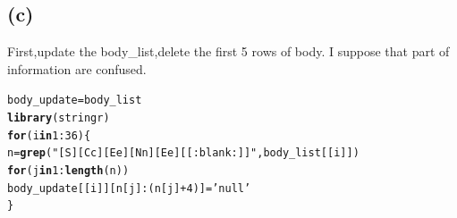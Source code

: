 \documentclass{article}\usepackage[]{graphicx}\usepackage[]{color}
\makeatletter
\newcommand{\hlnum}[1]{\textcolor[rgb]{0.686,0.059,0.569}{#1}}%
\newcommand{\hlstr}[1]{\textcolor[rgb]{0.192,0.494,0.8}{#1}}%
\newcommand{\hlopt}[1]{\textcolor[rgb]{0,0,0}{#1}}%
\newcommand{\hlstd}[1]{\textcolor[rgb]{0.345,0.345,0.345}{#1}}%
\newcommand{\hlkwa}[1]{\textcolor[rgb]{0.161,0.373,0.58}{\textbf{#1}}}%
\newcommand{\hlkwb}[1]{\textcolor[rgb]{0.69,0.353,0.396}{#1}}%
\newcommand{\hlkwd}[1]{\textcolor[rgb]{0.737,0.353,0.396}{\textbf{#1}}}%
\newenvironment{kframe}{%
 \def\at@end@of@kframe{}%
 \ifinner\ifhmode%
  \def\at@end@of@kframe{\end{minipage}}%
  \begin{minipage}{\columnwidth}%
 \fi\fi%
 \def\FrameCommand##1{\hskip\@totalleftmargin \hskip-\fboxsep
 \colorbox{shadecolor}{##1}\hskip-\fboxsep
     \hskip-\linewidth \hskip-\@totalleftmargin \hskip\columnwidth}%
 \MakeFramed {\advance\hsize-\width
   \@totalleftmargin\z@ \linewidth\hsize
   \@setminipage}}%
 {\par\unskip\endMakeFramed%
 \at@end@of@kframe}
\newenvironment{knitrout}{}{} %
\makeatother
\begin{document}
\subsection{(c)}

First,update the body\_list,delete the first 5 rows of body. I suppose that part of information are confused.
\begin{knitrout}
\color{fgcolor}\begin{kframe}
\begin{alltt}
\hlstd{body_update}\hlkwb{=}\hlstd{body_list}
\hlkwd{library}\hlstd{(stringr)}
\hlkwa{for}\hlstd{(i} \hlkwa{in} \hlnum{1}\hlopt{:}\hlnum{36}\hlstd{)\{}
  \hlstd{n}\hlkwb{=}\hlkwd{grep}\hlstd{(}\hlstr{"[S][Cc][Ee][Nn][Ee][[:blank:]]"}\hlstd{,body_list[[i]])}
  \hlkwa{for}\hlstd{(j} \hlkwa{in} \hlnum{1}\hlopt{:}\hlkwd{length}\hlstd{(n))}
  \hlstd{body_update[[i]][n[j]}\hlopt{:}\hlstd{(n[j]}\hlopt{+}\hlnum{4}\hlstd{)]}\hlkwb{=}\hlstr{'null'}
\hlstd{\}}
\end{alltt}
\end{kframe}
\end{knitrout}
\end{document}
